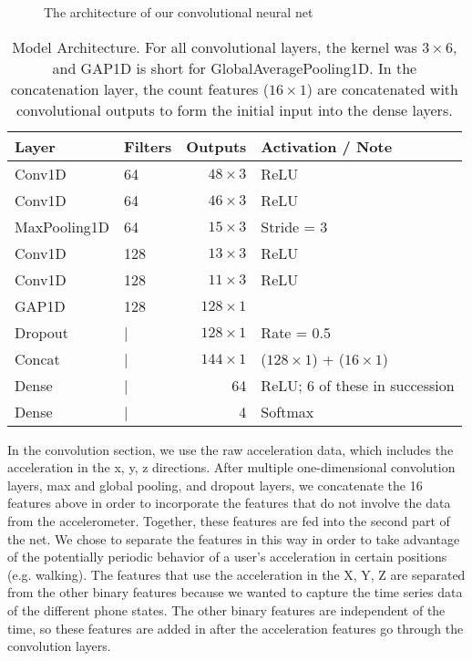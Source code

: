 \begin{figure*}[!h]
  \vspace{-0.2cm}
  \centering
   {}
  \caption{The architecture of our convolutional neural net}
  \label{fig:ConvNet}
  \vspace{-0.1cm}
\end{figure*}


\begin{table}[!h]
\begin{center}
\begin{tabular}{llrp{2.5cm}}\toprule
Layer 	&  	 	Filters 	& 	Outputs  	&  	Activation \newline / Note\\\midrule
Conv1D  	&  	64 		& 	$48 \times 3$	&  ReLU \\
Conv1D  & 	64 		&	$46 \times 3 $ 	& ReLU  \\
MaxPooling1D  &  64 		& 	$15 \times 3$	& Stride = 3\\
Conv1D & 		128 	& 	$13 \times 3$&  ReLU\\
Conv1D & 128 & $11 \times 3$ & ReLU\\
GAP1D & 128 & $128 \times 1$ & \\
Dropout & | &  $128 \times 1$ & Rate = 0.5\\
Concat  & | & $144 \times 1$&  ($128 \times 1$) \newline + ($16 \times 1$)\\
Dense & | & 64 & ReLU; 6 of these in succession \\
Dense & | & 4 & Softmax

\end{tabular}
\caption{Model Architecture. For all convolutional layers, the kernel was $3 \times 6$, and GAP1D is short for GlobalAveragePooling1D. In the concatenation layer, the count features ($16 \times 1$) are concatenated with convolutional outputs to form the initial input into the dense layers.}
\label{tab:ArchDescription}
\end{center}
\end{table}

In the convolution section, we use the raw acceleration data, which includes the acceleration in the x, y, z directions. 
After multiple one-dimensional convolution layers, max and global pooling, and dropout layers, 
we concatenate the 16 features above in order to incorporate the features that do not involve the data from the accelerometer.  
Together, these features are fed into the second part of the net.  
We chose to separate the features in this way in order to take advantage of the potentially periodic behavior of a user's acceleration in certain positions (e.g. walking).
The features that use the acceleration in the X, Y, Z are separated from the other binary features because we wanted to capture the time series data of the different phone states.
The other binary features are independent of the time, so these features are added in after the acceleration features go through the convolution layers.  

